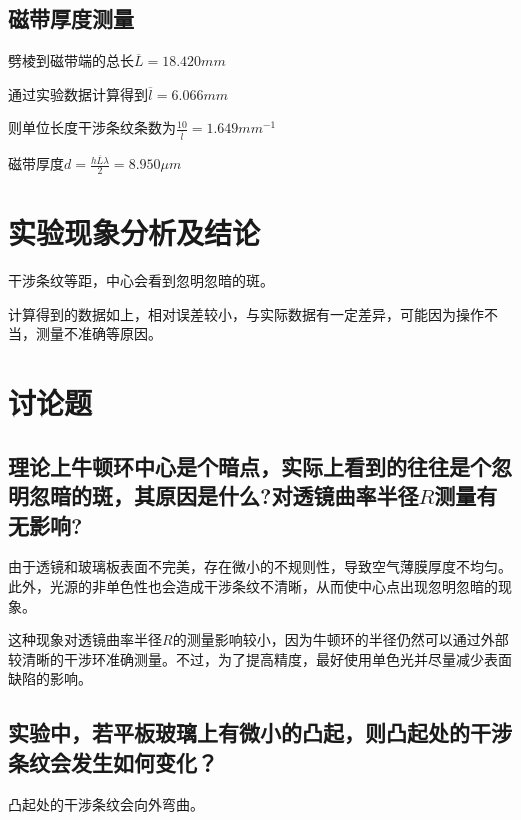 \documentclass[signature=data]{physicsreport}
\begin{document}
\subsection{磁带厚度测量}
劈棱到磁带端的总长$\overline{L}=18.420mm$

通过实验数据计算得到$\overline{l}=6.066mm$

则单位长度干涉条纹条数为$\frac{10}{\overline{l}}=1.649mm^{-1}$

磁带厚度$d=\frac{h\overline{L}\lambda}{2}=8.950\mu m $



\newpage

\section{实验现象分析及结论}
干涉条纹等距，中心会看到忽明忽暗的斑。

计算得到的数据如上，相对误差较小，与实际数据有一定差异，可能因为操作不当，测量不准确等原因。

\section{讨论题}



\subsection{理论上牛顿环中心是个暗点，实际上看到的往往是个忽明忽暗的斑，其原因是什么?对透镜曲率半径$R$测量有无影响?}

由于透镜和玻璃板表面不完美，存在微小的不规则性，导致空气薄膜厚度不均匀。此外，光源的非单色性也会造成干涉条纹不清晰，从而使中心点出现忽明忽暗的现象。

这种现象对透镜曲率半径$R$的测量影响较小，因为牛顿环的半径仍然可以通过外部较清晰的干涉环准确测量。不过，为了提高精度，最好使用单色光并尽量减少表面缺陷的影响。

\subsection{实验中，若平板玻璃上有微小的凸起，则凸起处的干涉条纹会发生如何变化？}

凸起处的干涉条纹会向外弯曲。
\end{document}
